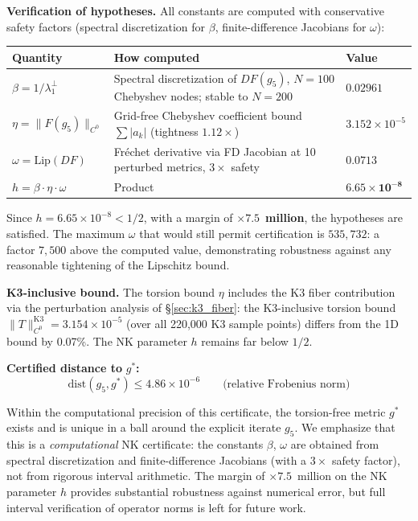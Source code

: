 \documentclass[11pt,a4paper]{article}
\newcommand{\Lip}{\mathrm{Lip}}
\newcommand{\dist}{\mathrm{dist}}
\newcommand{\norm}[1]{\|#1\|}
\theoremstyle{remark}
\begin{document}
\textbf{Verification of hypotheses.} All constants are computed with conservative safety
factors (spectral discretization for $\beta$, finite-difference Jacobians for $\omega$):

\begin{table}[H]
\centering
\begin{tabular}{p{2.8cm}p{8cm}l}
\toprule
\textbf{Quantity} & \textbf{How computed} & \textbf{Value} \\
\midrule
$\beta = 1/\lambda_1^\perp$ & Spectral discretization of $DF(g_5)$, $N = 100$ Chebyshev nodes; stable to $N = 200$ & $0.02961$ \\[0.3em]
$\eta = \norm{F(g_5)}_{C^0}$ & Grid-free Chebyshev coefficient bound $\sum|a_k|$ (tightness $1.12\times$) & $3.152 \times 10^{-5}$ \\[0.3em]
$\omega = \Lip(DF)$ & Fr\'echet derivative via FD Jacobian at 10 perturbed metrics, $3\times$ safety & $0.0713$ \\[0.3em]
$h = \beta \cdot \eta \cdot \omega$ & Product & $\mathbf{6.65 \times 10^{-8}}$ \\
\bottomrule
\end{tabular}
\end{table}

Since $h = 6.65 \times 10^{-8} < 1/2$, with a margin of $\mathbf{\times 7.5}$~\textbf{million}, the hypotheses
are satisfied. The maximum $\omega$ that would still permit certification is $535{,}732$: a
factor $7{,}500$ above the computed value, demonstrating robustness against any
reasonable tightening of the Lipschitz bound.

\textbf{K3-inclusive bound.} The torsion bound $\eta$ includes the K3 fiber contribution
via the perturbation analysis of \S\ref{sec:k3_fiber}: the K3-inclusive torsion bound
$\norm{T}_{C^0}^{\mathrm{K3}} = 3.154 \times 10^{-5}$ (over all 220,000 K3 sample points) differs
from the 1D bound by 0.07\%. The NK parameter $h$ remains far below $1/2$.

\textbf{Certified distance to} $g^*$\textbf{:}
\begin{equation}\label{eq:dist_gstar}
\dist(g_5, g^*) \leq 4.86 \times 10^{-6} \qquad \text{(relative Frobenius norm)}
\end{equation}

Within the computational precision of this certificate, the torsion-free metric $g^*$
exists and is unique in a ball around the explicit iterate $g_5$. We emphasize that this
is a \textit{computational} NK certificate: the constants $\beta$, $\omega$ are obtained from spectral
discretization and finite-difference Jacobians (with a $3\times$ safety factor), not from
rigorous interval arithmetic. The margin of ${\times}7.5$~million on the NK parameter $h$
provides substantial robustness against numerical error, but full interval
verification of operator norms is left for future work.
\end{document}
